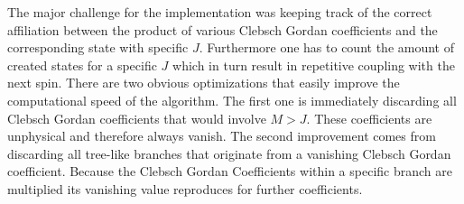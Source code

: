 \documentclass{scrartcl}
\begin{document}
The major challenge for the implementation was keeping track of the correct affiliation between the product of various Clebsch Gordan coefficients and the corresponding state with specific $J$. Furthermore one has to count the amount of created states for a specific $J$ which in turn result in repetitive coupling with the next spin. There are two obvious optimizations that easily improve the computational speed of the algorithm. The first one is immediately discarding all Clebsch Gordan coefficients that would involve $M>J$. These coefficients are unphysical and therefore always vanish. The second improvement comes from discarding all tree-like branches that originate from a vanishing Clebsch Gordan coefficient. Because the Clebsch Gordan Coefficients within a specific branch are multiplied its vanishing value reproduces for further coefficients.
\end{document}
